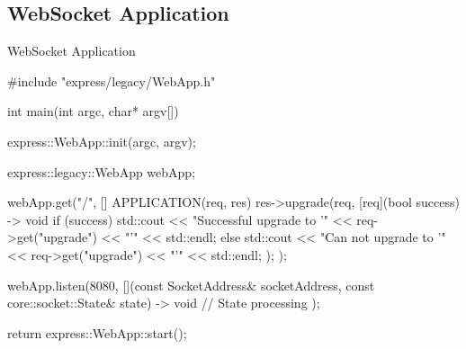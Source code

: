 ﻿\subsection{WebSocket Application}

\begin{frame}[fragile]{WebSocket Application}
  \begin{cppcode}[autogobble=true, caption={WebSocket Application.},captionpos=b]
    #include "express/legacy/WebApp.h"

    int main(int argc, char* argv[]) {
        express::WebApp::init(argc, argv);

        express::legacy::WebApp webApp;

        webApp.get("/", [] APPLICATION(req, res) {
            res->upgrade(req, [req](bool success) -> void {
                if (success) {
                    std::cout << "Successful upgrade to '" << req->get("upgrade") << "'" << std::endl;
                } else {
                    std::cout << "Can not upgrade to '" << req->get("upgrade") << "'" << std::endl;
                }
            });
        });

        webApp.listen(8080, [](const SocketAddress& socketAddress,
                               const core::socket::State& state) -> void {
            // State processing
        });

        return express::WebApp::start();
    }
  \end{cppcode}
\end{frame}

